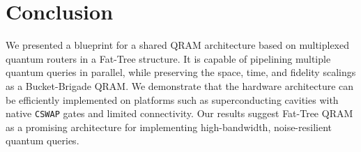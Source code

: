 \section{Conclusion}
We presented a blueprint for a shared QRAM architecture based on multiplexed quantum routers in a Fat-Tree structure. It is capable of pipelining multiple quantum queries in parallel, while preserving the space, time, and fidelity scalings as a Bucket-Brigade QRAM. We demonstrate that the hardware architecture can be efficiently implemented on platforms such as superconducting cavities with native \texttt{CSWAP} gates and limited connectivity. Our results suggest Fat-Tree QRAM as a promising architecture for implementing high-bandwidth, noise-resilient quantum queries.